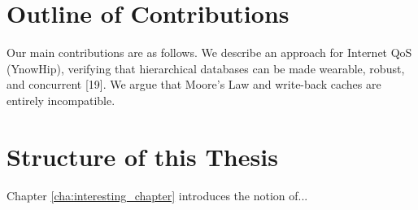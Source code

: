 \section{Outline of Contributions}
\label{sec:contributions}

Our main contributions are as follows. We describe an approach for Internet QoS (YnowHip), verifying that hierarchical databases can be made wearable, robust, and concurrent [19]. We argue that Moore's Law and write-back caches are entirely incompatible.

\section{Structure of this Thesis}
\label{sec:structure_of_this_thesis}

Chapter \ref{cha:interesting_chapter} introduces the notion of...

